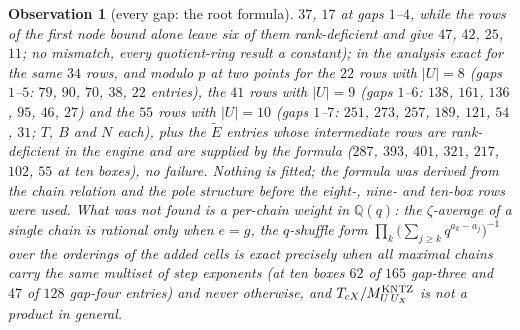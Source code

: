 \documentclass[11pt]{article}
\newtheorem{observation}{Observation}
\newcommand{\Et}{\widetilde{E}}
\begin{document}
\begin{observation}[every gap: the root formula]
$37$, $17$ at gaps $1$--$4$, while the rows of the first node bound alone leave six of them rank-deficient and give $47$,
$42$, $25$, $11$; no mismatch, every quotient-ring result a constant); in the analysis
exact for the same $34$ rows, and modulo $p$ at two points for the $22$ rows with $|U|=8$ (gaps $1$--$5$: $79$, $90$,
$70$, $38$, $22$ entries), the $41$ rows with $|U|=9$ (gaps $1$--$6$: $138$, $161$, $136$, $95$, $46$, $27$) and the
$55$ rows with $|U|=10$ (gaps $1$--$7$: $251$, $273$, $257$, $189$, $121$, $54$, $31$; $T$, $B$ and $N$ each), plus the
$\Et$ entries whose intermediate rows are rank-deficient in the engine and are supplied by the formula ($287$, $393$,
$401$, $321$, $217$, $102$, $55$ at ten boxes), no failure.  Nothing is fitted; the formula was derived from the chain
relation and the pole structure before the eight-, nine- and ten-box rows were used.  What was \emph{not} found is a
per-chain weight in $\mathbb Q(q)$: the $\zeta$-average of a single chain is rational only when $e=g$, the
$q$-shuffle form $\prod_k\bigl(\sum_{j\ge k}q^{a_k-a_j}\bigr)^{-1}$ over the orderings of the added cells is exact
precisely when all maximal chains carry the same multiset of step exponents (at ten boxes $62$ of $165$ gap-three and
$47$ of $128$ gap-four entries) and never otherwise, and $T_{cX}/M^{\rm KNTZ}_{U\,U_X}$ is not a product in general.
\end{observation}
\end{document}
